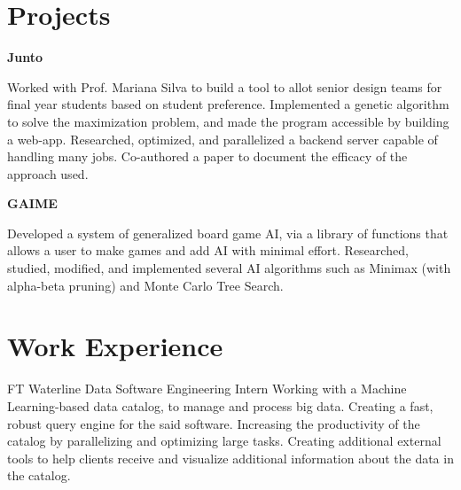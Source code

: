 \documentclass[10pt, oneside]{article} %
\begin{document}
\begin{paracol}{2}
\begin{supertabular}{ll}
\end{supertabular}



\section{Projects}

{\raggedright\textbf{Junto}\\}

Worked with Prof. Mariana Silva to build a tool to allot senior design teams for final year students based on student preference. Implemented a genetic algorithm to solve the maximization problem, and made the program accessible by building a web-app. Researched, optimized, and parallelized a backend server capable of handling many jobs. Co-authored a paper to document the efficacy of the approach used.\\

{\raggedright\textbf{GAIME}\\}

Developed a system of generalized board game AI, via a library of functions that allows a user to make games and add AI with minimal effort. Researched, studied, modified, and implemented several AI algorithms such as Minimax (with alpha-beta pruning) and Monte Carlo Tree Search.


\section{Work Experience}




{FT} %
{Waterline Data} %
{Software Engineering Intern} %
{Working with a Machine Learning-based data catalog, to manage and process big data. Creating a fast, robust query engine for the said software. Increasing the productivity of the catalog by parallelizing and optimizing large tasks. Creating additional external tools to help clients receive and visualize additional information about the data in the catalog.}%


\end{paracol}
\end{document}
